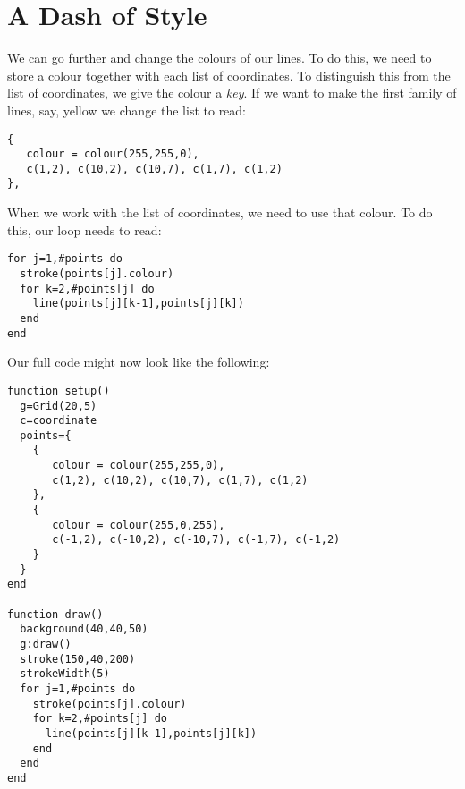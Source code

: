 \documentclass[
  xhtml,%
  use filename%
]{internet}
\begin{document}
\section{A Dash of Style}

We can go further and change the colours of our lines.
To do this, we need to store a colour together with each list of coordinates.
To distinguish this from the list of coordinates, we give the colour a \emph{key}.
If we want to make the first family of lines, say, yellow we change the list to read:

\begin{verbatim}
{
   colour = colour(255,255,0),
   c(1,2), c(10,2), c(10,7), c(1,7), c(1,2)
},
\end{verbatim}

When we work with the list of coordinates, we need to use that colour.
To do this, our loop needs to read:

\begin{verbatim}
for j=1,#points do
  stroke(points[j].colour)
  for k=2,#points[j] do
    line(points[j][k-1],points[j][k])
  end
end
\end{verbatim}

Our full code might now look like the following:

\begin{verbatim}
function setup()
  g=Grid(20,5)
  c=coordinate
  points={
    {
       colour = colour(255,255,0),
       c(1,2), c(10,2), c(10,7), c(1,7), c(1,2)
    },
    {
       colour = colour(255,0,255),
       c(-1,2), c(-10,2), c(-10,7), c(-1,7), c(-1,2)
    }
  }
end

function draw()
  background(40,40,50)
  g:draw()
  stroke(150,40,200)
  strokeWidth(5)
  for j=1,#points do
    stroke(points[j].colour)
    for k=2,#points[j] do
      line(points[j][k-1],points[j][k])
    end
  end
end
\end{verbatim}
\end{document}
